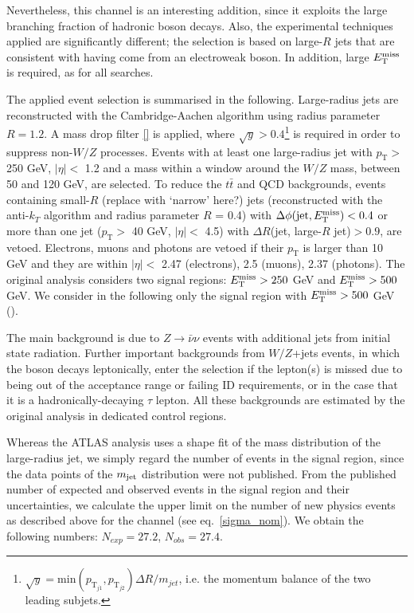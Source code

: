 Nevertheless, this channel is an interesting addition, since it exploits the large branching fraction of hadronic boson decays. Also, the experimental techniques applied are significantly different; the selection is based on large-$R$ jets that are consistent with having come from an electroweak boson. In addition, large $E_{\mathrm{T}}^{\mathrm{miss}}$ is required, as for all \monoX searches.

The applied event selection is summarised in the following. Large-radius jets are reconstructed with the Cambridge-Aachen algorithm using radius parameter $R = 1.2$. A mass drop filter \ref{} is applied, where $\sqrt{y}>0.4$\footnote{$\sqrt{y} = \mathrm{min}(p_{\mathrm{T}_{j1}},p_{\mathrm{T}_{j2}})\Delta R / m_{jet}$, i.e. the momentum balance of the two leading subjets.} is required in order to suppress non-$W/Z$ processes.
Events with at least one large-radius jet with $p_{\mathrm{T}} >$ 250 GeV, $|\eta| <$ 1.2 and a mass within a window around the $W/Z$ mass, between 50 and 120 GeV, are selected.
To reduce the $t \bar{t}$ and QCD backgrounds, events containing small-$R$ (replace with `narrow' here?) jets (reconstructed with the anti-$k_T$ algorithm and radius parameter $R$ = 0.4) with $\Delta\phi(\mathrm{jet},E_{\mathrm{T}}^{\mathrm{miss}})< 0.4$ or more than one jet ($p_{\mathrm{T}} >$ 40 GeV, $|\eta| <$ 4.5) with $\Delta R$(jet, large-$R$ jet)$>0.9$, are vetoed. Electrons, muons and photons are vetoed if their $p_{\mathrm{T}}$ is larger than 10 GeV and they are within $|\eta| <$ 2.47 (electrons), 2.5 (muons), 2.37 (photons). The original analysis considers two signal regions: $E_{\mathrm{T}}^{\mathrm{miss}} > 250$ GeV and $E_{\mathrm{T}}^{\mathrm{miss}} > 500$ GeV. We consider in the following only the signal region with $E_{\mathrm{T}}^{\mathrm{miss}} > 500$ GeV ().

The main background is due to $Z \rightarrow \bar{\nu} \nu$ events with additional jets from initial state radiation. Further important backgrounds from $W/Z$+jets events, in which the boson decays leptonically, enter the selection if the lepton(s) is missed due to being out of the acceptance range or failing ID requirements, or in the case that it is a hadronically-decaying $\tau$ lepton. All these backgrounds are estimated by the original analysis in dedicated control regions.

Whereas the ATLAS analysis uses a shape fit of the mass distribution of the large-radius jet, we simply regard the number of events in the signal region, since the data points of the $m_{\rm jet}$ distribution were not published.  From the published number of expected and observed events in the signal region and their uncertainties, we  calculate the upper limit on the number of new physics events as described above for the \monoZ channel (see eq.~\ref{sigma_nom}). We obtain the following numbers:  $N_{exp} = 27.2$, $N_{obs} = 27.4$.

